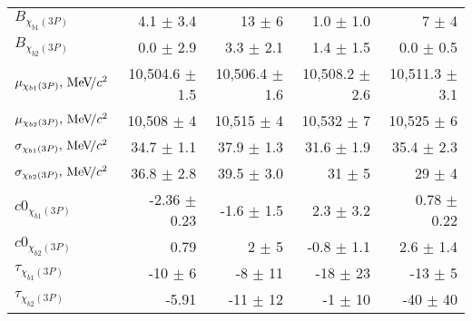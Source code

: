 \begin{table}[H]
{{\begin{tabular}{lrrrr}
\rule{0pt}{4ex}$B_{\chi_{b1}(3P)}$ & 4.1 $\pm$ 3.4 & 13 $\pm$ 6 & 1.0 $\pm$ 1.0 & 7 $\pm$ 4\\
$B_{\chi_{b2}(3P)}$ & 0.0 $\pm$ 2.9 & 3.3 $\pm$ 2.1 & 1.4 $\pm$ 1.5 & 0.0 $\pm$ 0.5\\

\rule{0pt}{4ex}$\mu_{\chi_{b1}(3P)}, {\mathrm{\,Me\kern -0.1em V\!/}c^2}$ & 10,504.6 $\pm$ 1.5 & 10,506.4 $\pm$ 1.6 & 10,508.2 $\pm$ 2.6 & 10,511.3 $\pm$ 3.1\\
$\mu_{\chi_{b2}(3P)}, {\mathrm{\,Me\kern -0.1em V\!/}c^2}$ & 10,508 $\pm$ 4 & 10,515 $\pm$ 4 & 10,532 $\pm$ 7 & 10,525 $\pm$ 6\\

\rule{0pt}{4ex}$\sigma_{\chi_{b1}(3P)}, {\mathrm{\,Me\kern -0.1em V\!/}c^2}$ & 34.7 $\pm$ 1.1 & 37.9 $\pm$ 1.3 & 31.6 $\pm$ 1.9 & 35.4 $\pm$ 2.3\\
$\sigma_{\chi_{b2}(3P)}, {\mathrm{\,Me\kern -0.1em V\!/}c^2}$ & 36.8 $\pm$ 2.8 & 39.5 $\pm$ 3.0 & 31 $\pm$ 5 & 29 $\pm$ 4\\

\rule{0pt}{4ex}$c0_{\chi_{b1}(3P)}$ & -2.36 $\pm$ 0.23 & -1.6 $\pm$ 1.5 & 2.3 $\pm$ 3.2 & 0.78 $\pm$ 0.22\\
$c0_{\chi_{b2}(3P)}$ & 0.79 & 2 $\pm$ 5 & -0.8 $\pm$ 1.1 & 2.6 $\pm$ 1.4\\

\rule{0pt}{4ex}$\tau_{\chi_{b1}(3P)}$ & -10 $\pm$ 6 & -8 $\pm$ 11 & -18 $\pm$ 23 & -13 $\pm$ 5\\
$\tau_{\chi_{b2}(3P)}$ & -5.91 & -11 $\pm$ 12 & -1 $\pm$ 10 & -40 $\pm$ 40\\
\bottomrule
\end{tabular}
} %

} %
\label{tab:mc:chib3p_ups1s:fits}
\end{table}


